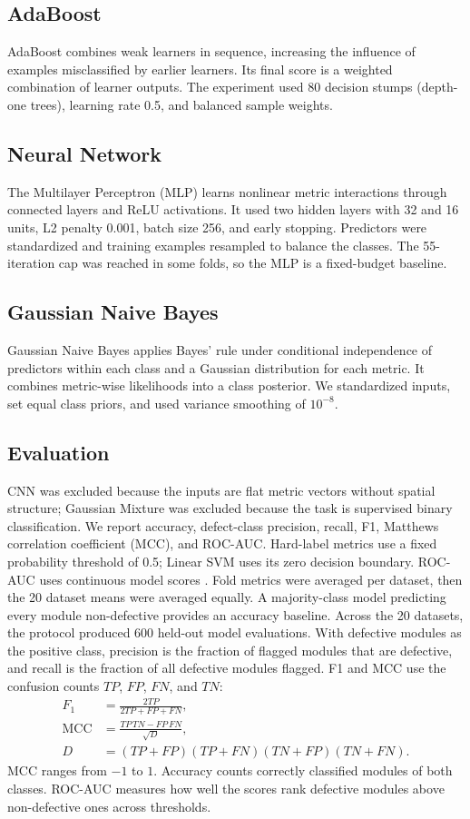\documentclass[conference]{IEEEtran}
\begin{document}
\subsection{AdaBoost}
AdaBoost combines weak learners in sequence, increasing the influence of examples misclassified by earlier learners. Its final score is a weighted combination of learner outputs. The experiment used 80 decision stumps (depth-one trees), learning rate 0.5, and balanced sample weights.
\subsection{Neural Network}
The Multilayer Perceptron (MLP) learns nonlinear metric interactions through connected layers and ReLU activations. It used two hidden layers with 32 and 16 units, L2 penalty 0.001, batch size 256, and early stopping. Predictors were standardized and training examples resampled to balance the classes. The 55-iteration cap was reached in some folds, so the MLP is a fixed-budget baseline.
\subsection{Gaussian Naive Bayes}
Gaussian Naive Bayes applies Bayes' rule under conditional independence of predictors within each class and a Gaussian distribution for each metric. It combines metric-wise likelihoods into a class posterior. We standardized inputs, set equal class priors, and used variance smoothing of $10^{-8}$.
\subsection{Evaluation}
CNN was excluded because the inputs are flat metric vectors without spatial structure; Gaussian Mixture was excluded because the task is supervised binary classification. We report accuracy, defect-class precision, recall, F1, Matthews correlation coefficient (MCC), and ROC-AUC. Hard-label metrics use a fixed probability threshold of 0.5; Linear SVM uses its zero decision boundary. ROC-AUC uses continuous model scores \cite{fawcett2006}. Fold metrics were averaged per dataset, then the 20 dataset means were averaged equally. A majority-class model predicting every module non-defective provides an accuracy baseline.
Across the 20 datasets, the protocol produced 600 held-out model evaluations. With defective modules as the positive class, precision is the fraction of flagged modules that are defective, and recall is the fraction of all defective modules flagged. F1 and MCC use the confusion counts $TP$, $FP$, $FN$, and $TN$:
\begin{align}
F_1 &= \frac{2TP}{2TP+FP+FN},\\
\mathrm{MCC} &= \frac{TP\,TN-FP\,FN}{\sqrt{D}},\\
D &= (TP+FP)(TP+FN)(TN+FP)(TN+FN).
\end{align}
MCC ranges from $-1$ to $1$. Accuracy counts correctly classified modules of both classes. ROC-AUC measures how well the scores rank defective modules above non-defective ones across thresholds.
\end{document}
